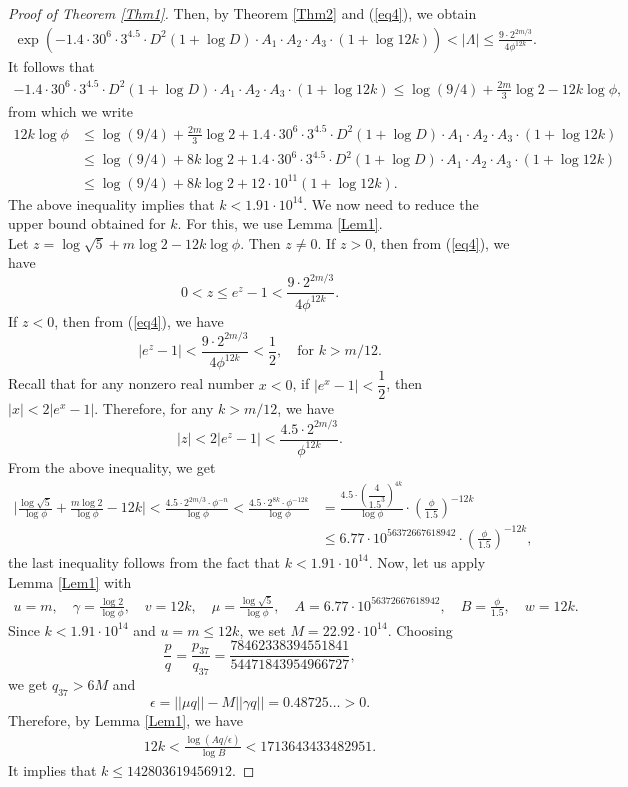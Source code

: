 \documentclass[10pt,a4paper]{amsart}
\begin{document}
\begin{proof}[Proof of Theorem \ref{Thm1}]
Then, by Theorem \ref{Thm2} and (\ref{eq4}), we obtain 
\begin{align*}
    \exp(-1.4\cdot 30^{6}\cdot 3^{4.5}\cdot D^2(1+\log D)\cdot A_1\cdot A_2\cdot A_3\cdot (1+\log 12k))<|\Lambda|\leq\frac{9\cdot 2^{2m/3}}{4\phi^{12k}}.
\end{align*}
It follows that
\begin{align*}
-1.4\cdot 30^{6}\cdot 3^{4.5}\cdot D^2(1+\log D)\cdot A_1\cdot A_2\cdot A_3\cdot(1+\log 12k)\leq \log(9/4)+\frac{2m}{3}\log2-12k\log \phi,
\end{align*}
from which we write
\begin{align*}
12k\log \phi&\leq \log(9/4)+\frac{2m}{3}\log2+1.4\cdot 30^{6}\cdot 3^{4.5}\cdot D^2(1+\log D)\cdot A_1\cdot A_2\cdot A_3\cdot(1+\log 12k)\\
&\leq\log(9/4)+8k\log2+1.4\cdot 30^{6}\cdot 3^{4.5}\cdot D^2(1+\log D)\cdot A_1\cdot A_2\cdot A_3\cdot(1+\log12k)\\
&\leq \log(9/4)+8k\log2+12\cdot10^{11}(1+\log 12k).
\end{align*}
The above inequality implies that $k<1.91\cdot 10^{14}$. We now need to reduce the upper bound obtained for $k$. For this, we use Lemma \ref{Lem1}.\\
Let $z=\log\sqrt{5}+m\log 2-12k\log \phi$. Then $z\neq 0$. If $z>0$, then from (\ref{eq4}), we have
$$0<z\leq e^{z}-1<\frac{9\cdot 2^{2m/3}}{4\phi^{12k}}.$$
If $z<0$, then from (\ref{eq4}), we have
$$|e^{z}-1|<\frac{9\cdot 2^{2m/3}}{4\phi^{12k}}<\frac{1}{2}, \quad \text{for }k> m/12.$$
Recall that for any nonzero real number $x<0$, if $|e^{x}-1| <\dfrac{1}{2}$, then $
|x| < 2|e^{x}-1|$. Therefore, for any $k> m/12$, we have 
$$|z|<2|e^{z}-1|<\frac{4.5\cdot 2^{2m/3}}{\phi^{12k}}.$$
From the above inequality, we get
\begin{align*}
\bigg|\frac{\log\sqrt{5}}{\log\phi}+\frac{m\log2}{\log\phi}-12k\bigg|<\frac{4.5\cdot 2^{2m/3}\cdot\phi^{-n}}{\log\phi}<\frac{4.5\cdot 2^{8k}\cdot\phi^{-{12k}}}{\log\phi}&=\frac{4.5\cdot (\dfrac{4}{1.5^3})^{4k}}{\log\phi}\cdot (\frac{\phi}{1.5})^{-12k}\label{eq5}\tag{5}\\
&\leq 6.77\cdot 10^{56372667618942}\cdot (\frac{\phi}{1.5})^{-12k}, 
\end{align*}
the last inequality follows from the fact that $k<1.91\cdot 10^{14}$.
Now, let us apply Lemma \ref{Lem1} with
\begin{align*}
    u=m,\quad \gamma=\frac{\log2}{\log \phi},\quad v=12k,\quad \mu=\frac{\log\sqrt{5}}{\log \phi},\quad A=6.77\cdot 10^{56372667618942},\quad B=\frac{\phi}{1.5},\quad w=12k.
\end{align*}
Since $k< 1.91\cdot  10^{14}$ and $u=m\leq 12k$, we set $M=22.92\cdot 10^{14}$. Choosing  
$$\frac{p}{q}=\frac{p_{37}}{q_{37}}=\frac{78462338394551841}{54471843954966727},$$
we get $q_{37}>6M$ and
$$\epsilon=||\mu q||-M||\gamma q||=0.48725\ldots>0.$$
Therefore, by Lemma \ref{Lem1}, we have
\begin{align*}
    12k<\frac{\log(Aq/\epsilon)}{\log B}<1713643433482951.
\end{align*}
It implies that $k\leq 142803619456912$. 



\end{proof}
\end{document}
